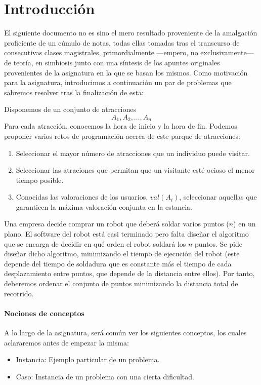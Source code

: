 \chapter*{Introducción}
El siguiente documento no es sino el mero resultado proveniente de la amalgación proficiente de un cúmulo de notas, todas ellas tomadas tras el transcurso de consecutivas clases magistrales, primordialmente —empero, no exclusivamente— de teoría, en simbiosis junto con una síntesis de los apuntes originales provenientes de la asignatura en la que se basan los mismos.
Como motivación para la asignatura, introducimos a continuación un par de problemas que sabremos resolver tras la finalización de esta:

\begin{ejercicio*}
Disponemos de un conjunto de atracciones 
\[
A_1, A_2, \ldots, A_n
\]
Para cada atracción, conocemos la hora de inicio y la hora de fin. Podemos proponer varios retos de programación acerca de este parque de atracciones:
\begin{enumerate}
    \item Seleccionar el mayor número de atracciones que un individuo puede visitar.
    \item Seleccionar las atraciones que permitan que un visitante esté ocioso el menor tiempo posible.
    \item Conocidas las valoraciones de los usuarios, $val(A_i)$, seleccionar aquellas que garanticen la máxima valoración conjunta en la estancia.
\end{enumerate}
\end{ejercicio*}

\begin{ejercicio*}
Una empresa decide comprar un robot que deberá soldar varios puntos ($n$) en un plano. El software del robot está casi terminado pero falta diseñar el algoritmo que se encarga de decidir en qué orden el robot soldará los $n$ puntos. Se pide diseñar dicho algoritmo, minimizando el tiempo de ejecución del robot (este depende del tiempo de soldadura que es constante más el tiempo de cada desplazamiento entre puntos, que depende de la distancia entre ellos). Por tanto, deberemos ordenar el conjunto de puntos minimizando la distancia total de recorrido.
\end{ejercicio*}

\subsubsection{Nociones de conceptos}
A lo largo de la asignatura, será común ver los siguientes conceptos, los cuales aclararemos antes de empezar la misma:
\begin{itemize}
    \item Instancia: Ejemplo particular de un problema.
    \item Caso: Instancia de un problema con una cierta dificultad.
\end{itemize}


